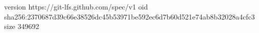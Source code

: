 version https://git-lfs.github.com/spec/v1
oid sha256:2370687d39c66e38526dc45b53971be592ec6d7b60d521e74ab8b32028a4cfc3
size 349692
